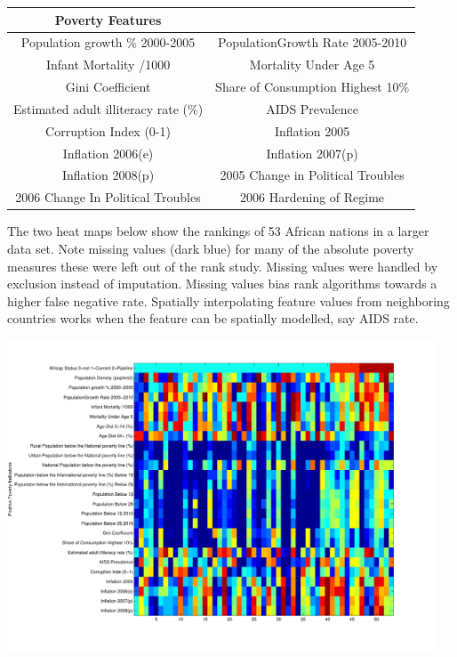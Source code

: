 \begin{tabular}{|c c|}
  \hline
   Poverty Features & \\
  \hline
Population growth \% 2000-2005 & PopulationGrowth Rate 2005-2010\\
Infant Mortality /1000 & Mortality Under Age 5\\
Gini Coefficient & Share of Consumption Highest 10\% \\
Estimated adult illiteracy rate (\%) & AIDS Prevalence \\
Corruption Index (0-1) & Inflation 2005 \\
Inflation 2006(e) & Inflation 2007(p) \\
Inflation 2008(p) & 2005 Change in Political Troubles \\
2006 Change In Political Troubles & 2006 Hardening of Regime\\
\hline
\end{tabular}

The two heat maps below show the rankings of 53 African nations in
a larger data set. Note
missing values (dark blue) for many of the absolute poverty
measures these were left out of the rank study.  Missing values
were handled by exclusion instead of imputation.  Missing values
bias rank algorithms towards a higher false negative rate.
Spatially interpolating feature values from neighboring countries
works when the feature can be spatially modelled, say AIDS rate.

\includegraphics[width=5in]{Images/GIS/PositivePovertyIndicatorHeatMap.pdf}

